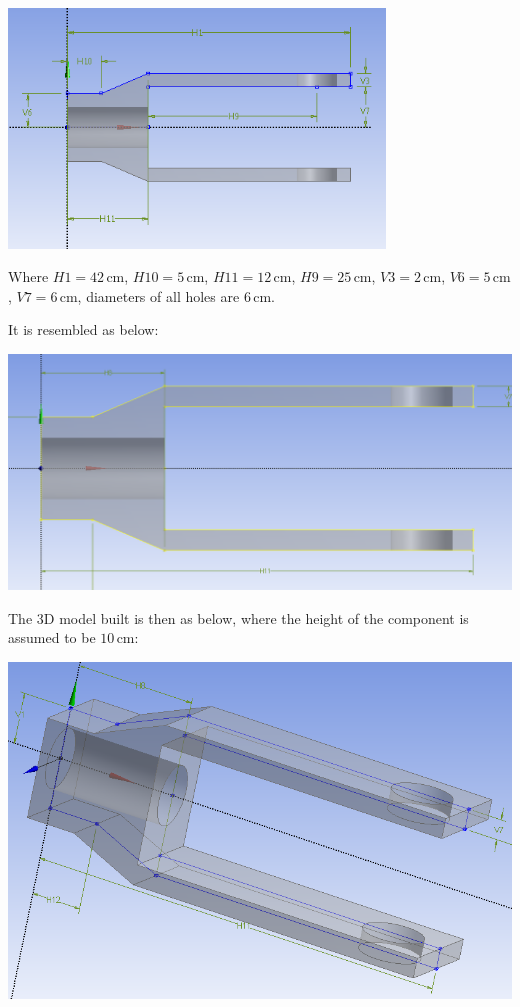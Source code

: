\documentclass[a4paper,14pt]{extarticle}
\newcommand{\cm}{\,\si{\centi\meter}}
\begin{document}
\begin{center}\includegraphics[width=0.75\textwidth]{2D_ORIGIN.png}\end{center}

Where $H1=42\cm$, $H10=5\cm$, $H11=12\cm$, $H9=25\cm$, $V3=2\cm$, $V6=5\cm$, $V7=6\cm$, diameters of all holes are $6\cm$.

It is resembled as below:

\includegraphics[width=\textwidth]{2D_S_01.PNG}

The 3D model built is then as below, where the height of the component is assumed to be $10 \cm$:

\includegraphics[width=\textwidth]{3D_S_01.PNG}
\end{document}
